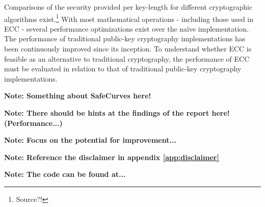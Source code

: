 Comparisons of the security provided per key-length for different cryptographic algorithms exist.\footnote{Source?!} With
most mathematical operations - including those used in ECC - several performance optimizations exist over the naïve
implementation. The performance of traditional public-key cryptography implementations has been continuously improved
since its inception. To understand whether ECC is feasible as an alternative to traditional cryptography, the performance
of ECC must be evaluated in relation to that of traditional public-key cryptography implementations.

\textbf{Note: Something about SafeCurves here!}

\textbf{Note: There should be hints at the findings of the report here! (Performance...)}

\textbf{Note: Focus on the potential for improvement...}

\textbf{Note: Reference the disclaimer in appendix \ref{app:disclaimer}}

\textbf{Note: The code can be found at...}